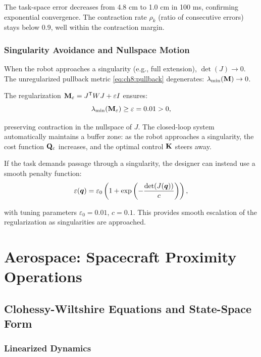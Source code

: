 The task-space error decreases from 4.8 cm to 1.0 cm in 100 ms, confirming exponential
convergence. The contraction rate $\rho_k$ (ratio of consecutive errors) stays below 0.9,
well within the contraction margin.

\subsubsection{Singularity Avoidance and Nullspace Motion}

When the robot approaches a singularity (e.g., full extension), $\det(J) \to 0$. The
unregularized pullback metric \eqref{eq:ch8:pullback} degenerates: $\lambda_{\min}(\mathbf{M}) \to 0$.

The regularization $\mathbf{M}_\varepsilon = J^{\mathsf{T}} W J + \varepsilon I$ ensures:
\begin{equation}
\lambda_{\min}(\mathbf{M}_\varepsilon) \ge \varepsilon = 0.01 > 0,
\end{equation}

preserving contraction in the nullspace of $J$. The closed-loop system automatically
maintains a buffer zone: as the robot approaches a singularity, the cost function $\mathbf{Q}_\varepsilon$
increases, and the optimal control $\mathbf{K}$ steers away.

If the task demands passage through a singularity, the designer can instead use a
smooth penalty function:
\begin{equation}
\varepsilon(\bm{q}) = \varepsilon_0 \left(1 + \exp\left(-\frac{\det(J(\bm{q}))}{c}\right)\right),
\label{eq:ch8:adaptive-reg}
\end{equation}

with tuning parameters $\varepsilon_0 = 0.01$, $c = 0.1$. This provides smooth escalation
of the regularization as singularities are approached.

\section{Aerospace: Spacecraft Proximity Operations}

\subsection{Clohessy-Wiltshire Equations and State-Space Form}

\subsubsection{Linearized Dynamics}

